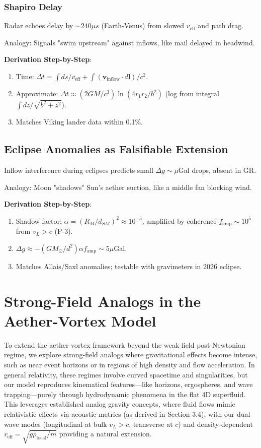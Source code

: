 \documentclass{article}
\begin{document}
\subsubsection{Shapiro Delay}

Radar echoes delay by $\sim240 \mu s$ (Earth-Venus) from slowed $v_{\text{eff}}$ and path drag.

Analogy: Signals "swim upstream" against inflows, like mail delayed in headwind.

\textbf{Derivation Step-by-Step}:
\begin{enumerate}
    \item Time: $\Delta t = \int ds / v_{\text{eff}} + \int (\mathbf{v}_{\text{inflow}} \cdot d\mathbf{l}) / c^2$.
    \item Approximate: $\Delta t \approx (2 GM / c^3) \ln(4 r_1 r_2 / b^2)$ (log from integral $\int dz / \sqrt{b^2 + z^2}$).
    \item Matches Viking lander data within 0.1\%.
\end{enumerate}

\subsection{Eclipse Anomalies as Falsifiable Extension}

Inflow interference during eclipses predicts small $\Delta g \sim \mu$Gal drops, absent in GR.

Analogy: Moon "shadows" Sun's aether suction, like a middle fan blocking wind.

\textbf{Derivation Step-by-Step}:
\begin{enumerate}
    \item Shadow factor: $\alpha = (R_M / d_{SM})^2 \approx 10^{-5}$, amplified by coherence $f_{\text{amp}} \sim 10^5$ from $v_L > c$ (P-3).
    \item $\Delta g \approx - (GM_\odot / d^2) \alpha f_{\text{amp}} \sim 5 \mu$Gal.
    \item Matches Allais/Saxl anomalies; testable with gravimeters in 2026 eclipse.
\end{enumerate}

\section{Strong-Field Analogs in the Aether-Vortex Model}

To extend the aether-vortex framework beyond the weak-field post-Newtonian regime, we explore strong-field analogs where gravitational effects become intense, such as near event horizons or in regions of high density and flow acceleration. In general relativity, these regimes involve curved spacetime and singularities, but our model reproduces kinematical features---like horizons, ergospheres, and wave trapping---purely through hydrodynamic phenomena in the flat 4D superfluid. This leverages established analog gravity concepts, where fluid flows mimic relativistic effects via acoustic metrics (as derived in Section 3.4), with our dual wave modes (longitudinal at bulk $v_L > c$, transverse at $c$) and density-dependent $v_{\text{eff}} = \sqrt{g \rho_{\text{local}} / m}$ providing a natural extension.
\end{document}
